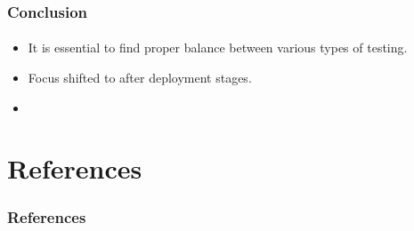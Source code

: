 \documentclass{beamer}
\begin{document}
\begin{frame}
	\frametitle{Conclusion}
	\framesubtitle{}
	\begin{itemize}
		\item It is essential to find proper balance between various types of testing.
		\item Focus shifted to after deployment stages. 
		\item
	\end{itemize}
\end{frame}

\section{References}
\begin{frame}[allowframebreaks]
	\frametitle{References}
	\framesubtitle{}

        \nocite{newman,cohn,infosys}
	
\end{frame}

\end{document}
